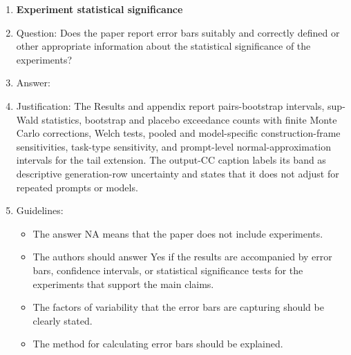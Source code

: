 \begin{enumerate}
\item {\bf Experiment statistical significance}
    \item[] Question: Does the paper report error bars suitably and correctly defined or other appropriate information about the statistical significance of the experiments?
    \item[] Answer: \answerYes{}
    \item[] Justification: The Results and appendix report pairs-bootstrap intervals, sup-Wald statistics, bootstrap and placebo exceedance counts with finite Monte Carlo corrections, Welch tests, pooled and model-specific construction-frame sensitivities, task-type sensitivity, and prompt-level normal-approximation intervals for the tail extension. The output-CC caption labels its band as descriptive generation-row uncertainty and states that it does not adjust for repeated prompts or models.
    \item[] Guidelines:
    \begin{itemize}
        \item The answer NA means that the paper does not include experiments.
        \item The authors should answer Yes if the results are accompanied by error bars, confidence intervals, or statistical significance tests for the experiments that support the main claims.
        \item The factors of variability that the error bars are capturing should be clearly stated.
        \item The method for calculating error bars should be explained.
    \end{itemize}


\end{enumerate}
